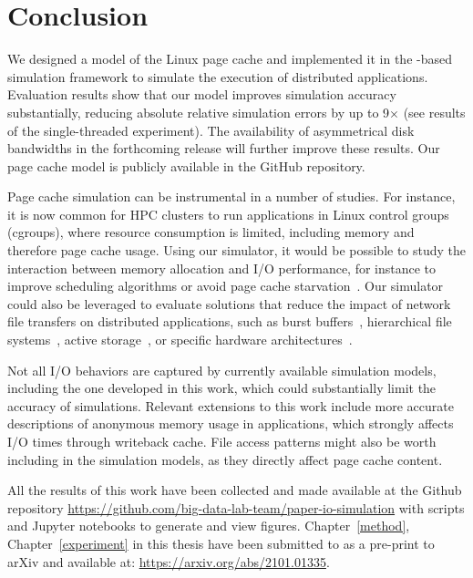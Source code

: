 \chapter{Conclusion}
\label{conclusion}

We designed a model of the Linux page cache and implemented it in the
\simgrid-based \wrench simulation framework to simulate the execution
of distributed applications.
Evaluation results show that our model improves simulation accuracy
substantially, reducing absolute relative simulation errors by up to
9$\times$ (see results of the single-threaded experiment). The
availability of asymmetrical disk bandwidths in the forthcoming
\simgrid release will further improve these results.
Our page cache model is publicly available in the \wrench GitHub
repository.

Page cache simulation can be instrumental in a number of studies. For
instance, it is now common for HPC clusters to run applications in
Linux control groups (cgroups), where resource consumption is limited,
including memory and therefore page cache usage. Using our simulator,
it would be possible to study the interaction between memory allocation
and I/O performance, for instance to improve scheduling algorithms or
avoid page cache starvation~\cite{zhuang2017}. Our simulator could also
be leveraged to evaluate solutions that reduce the impact of network
file transfers on distributed applications, such as burst
buffers~\cite{ferreiradasilva-fgcs-bb-2019}, hierarchical file
systems~\cite{islam2015triple}, active storage~\cite{5496981}, or
specific hardware architectures~\cite{hayot2020performance}. 

Not all I/O behaviors are captured by currently available simulation models,
including the one developed in this work, 
which could substantially limit the accuracy of simulations.
Relevant extensions to this work include more
accurate descriptions of anonymous memory usage in applications, 
which strongly affects I/O times through writeback cache. File access patterns
 might also be worth including in the simulation models,
as they directly affect page cache content.

All the results of this work have been collected and made available at the Github repository 
\url{https://github.com/big-data-lab-team/paper-io-simulation} 
with scripts and Jupyter notebooks to generate and view figures. 
Chapter~\ref{method}, Chapter~\ref{experiment} in this thesis have been 
submitted to as a pre-print to arXiv and available at: 
\url{https://arxiv.org/abs/2101.01335}. 
